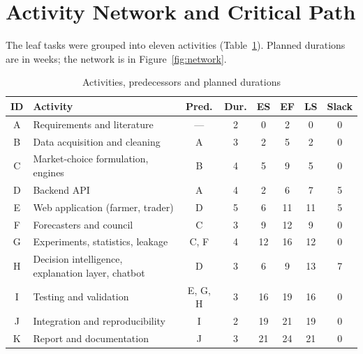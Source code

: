 \section{Activity Network and Critical Path}
\label{sec:network}

The leaf tasks were grouped into eleven activities (Table~\ref{tab:activities}). Planned durations are in weeks; the network is in Figure~\ref{fig:network}.

\begin{table}[!t]
\centering
\caption{Activities, predecessors and planned durations}
\label{tab:activities}
\small
\begin{tabular}{|c|p{5.6cm}|c|c|c|c|c|c|}
\hline
\textbf{ID} & \textbf{Activity} & \textbf{Pred.} & \textbf{Dur.} & \textbf{ES} & \textbf{EF} & \textbf{LS} & \textbf{Slack} \\ \hline
A & Requirements and literature & --- & 2 & 0 & 2 & 0 & 0 \\ \hline
B & Data acquisition and cleaning & A & 3 & 2 & 5 & 2 & 0 \\ \hline
C & Market-choice formulation, engines & B & 4 & 5 & 9 & 5 & 0 \\ \hline
D & Backend API & A & 4 & 2 & 6 & 7 & 5 \\ \hline
E & Web application (farmer, trader) & D & 5 & 6 & 11 & 11 & 5 \\ \hline
F & Forecasters and council & C & 3 & 9 & 12 & 9 & 0 \\ \hline
G & Experiments, statistics, leakage & C, F & 4 & 12 & 16 & 12 & 0 \\ \hline
H & Decision intelligence, explanation layer, chatbot & D & 3 & 6 & 9 & 13 & 7 \\ \hline
I & Testing and validation & E, G, H & 3 & 16 & 19 & 16 & 0 \\ \hline
J & Integration and reproducibility & I & 2 & 19 & 21 & 19 & 0 \\ \hline
K & Report and documentation & J & 3 & 21 & 24 & 21 & 0 \\ \hline
\end{tabular}
\end{table}

